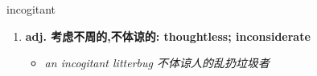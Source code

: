 
\begin{frame}
{\huge incogitant}
\begin{center}
\begin{enumerate}\Large
  \item \textbf{adj. 考虑不周的,不体谅的: thoughtless; inconsiderate}
  \begin{itemize}
    \item \em{\Large{an incogitant litterbug 不体谅人的乱扔垃圾者}}
  \end{itemize}
\end{enumerate}
\end{center}
\end{frame}
